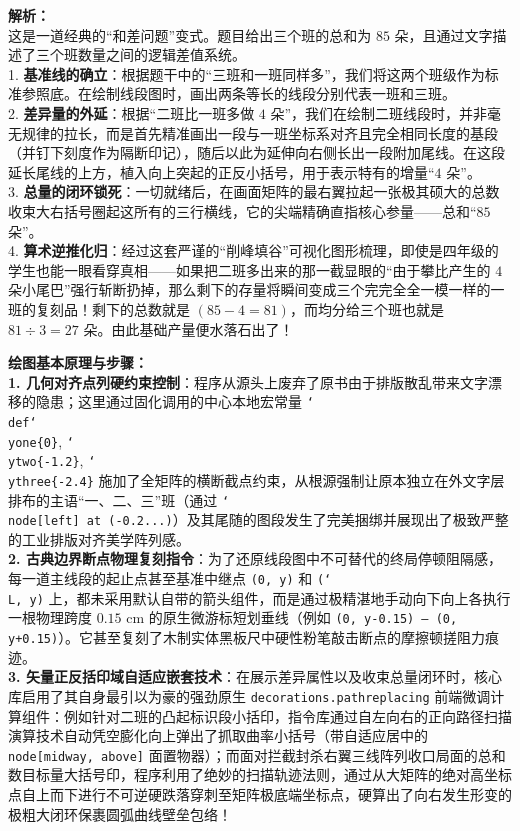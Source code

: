 {\small\color{gray}
\textbf{解析：}\\
这是一道经典的“和差问题”变式。题目给出三个班的总和为 $85$ 朵，且通过文字描述了三个班数量之间的逻辑差值系统。\\
1. \textbf{基准线的确立}：根据题干中的“三班和一班同样多”，我们将这两个班级作为标准参照底。在绘制线段图时，画出两条等长的线段分别代表一班和三班。\\
2. \textbf{差异量的外延}：根据“二班比一班多做 $4$ 朵”，我们在绘制二班线段时，并非毫无规律的拉长，而是首先精准画出一段与一班坐标系对齐且完全相同长度的基段（并钉下刻度作为隔断印记），随后以此为延伸向右侧长出一段附加尾线。在这段延长尾线的上方，植入向上突起的正反小括号，用于表示特有的增量“$4$ 朵”。\\
3. \textbf{总量的闭环锁死}：一切就绪后，在画面矩阵的最右翼拉起一张极其硕大的总数收束大右括号圈起这所有的三行横线，它的尖端精确直指核心参量——总和“$85$ 朵”。\\
4. \textbf{算术逆推化归}：经过这套严谨的“削峰填谷”可视化图形梳理，即使是四年级的学生也能一眼看穿真相——如果把二班多出来的那一截显眼的“由于攀比产生的 $4$ 朵小尾巴”强行斩断扔掉，那么剩下的存量将瞬间变成三个完完全全一模一样的一班的复刻品！剩下的总数就是 $(85-4=81)$，而均分给三个班也就是 $81 \div 3 = 27$ 朵。由此基础产量便水落石出了！
}

\vspace{0.6cm}

{\small\color{blue!70!black}
\textbf{绘图基本原理与步骤：}\\
\textbf{1. 几何对齐点列硬约束控制}：程序从源头上废弃了原书由于排版散乱带来文字漂移的隐患；这里通过固化调用的中心本地宏常量 \texttt{\char`\\def\char`\\yone\{0\}}, \texttt{\char`\\ytwo\{-1.2\}}, \texttt{\char`\\ythree\{-2.4\}} 施加了全矩阵的横断截点约束，从根源强制让原本独立在外文字层排布的主语“一、二、三”班（通过 \texttt{\char`\\node[left] at (-0.2...)}）及其尾随的图段发生了完美捆绑并展现出了极致严整的工业排版对齐美学阵列感。\\
\textbf{2. 古典边界断点物理复刻指令}：为了还原线段图中不可替代的终局停顿阻隔感，每一道主线段的起止点甚至基准中继点 \texttt{(0, y)} 和 \texttt{(\char`\\L, y)} 上，都未采用默认自带的箭头组件，而是通过极精湛地手动向下向上各执行一根物理跨度 $0.15\text{ cm}$ 的原生微游标短划垂线（例如 \texttt{(0, y-0.15) -- (0, y+0.15)}）。它甚至复刻了木制实体黑板尺中硬性粉笔敲击断点的摩擦顿搓阻力痕迹。\\
\textbf{3. 矢量正反括印域自适应嵌套技术}：在展示差异属性以及收束总量闭环时，核心库启用了其自身最引以为豪的强劲原生 \texttt{decorations.pathreplacing} 前端微调计算组件：例如针对二班的凸起标识段小括印，指令库通过自左向右的正向路径扫描演算技术自动凭空膨化向上弹出了抓取曲率小括号（带自适应居中的 \texttt{node[midway, above]} 面置物器）；而面对拦截封杀右翼三线阵列收口局面的总和数目标量大括号印，程序利用了绝妙的扫描轨迹法则，通过从大矩阵的绝对高坐标点自上而下进行不可逆硬跌落穿刺至矩阵极底端坐标点，硬算出了向右发生形变的极粗大闭环保裹圆弧曲线壁垒包络！
}

